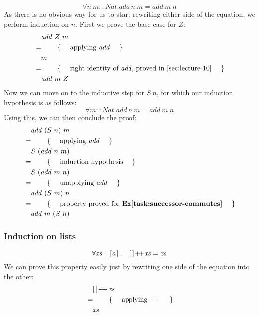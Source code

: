 \begin{displaymath}
\forall n~m :: \mathit{Nat} . \mathit{add}~n~m = \mathit{add}~m~n
\end{displaymath}
As there is no obvious way for us to start rewriting either side of the equation, we perform induction on $n$. First we prove the base case for $Z$:
\begin{align*}
\expr{\mathit{add}~Z~m}
\hint{applying $\mathit{add}$}
\expr{m}
\hint{right identity of $\mathit{add}$, proved in \Cref{sec:lecture-10}}
\lastexpr{\mathit{add}~m~Z}
\end{align*}
Now we can move on to the inductive step for $S~n$, for which our induction hypothesis is as follows:
\begin{displaymath}
\forall m :: \mathit{Nat} . \mathit{add}~n~m = \mathit{add}~m~n
\end{displaymath}
Using this, we can then conclude the proof:
\begin{align*}
&\quad \mathit{add}~(S~n)~m\\
&=\qquad\text{\{\quad\ applying $\mathit{add}$ \quad\}}\\
&\quad S~(\mathit{add}~n~m)\\
&=\qquad\text{\{\quad\ induction hypothesis \quad\}}\\
&\quad S~(\mathit{add}~m~n)\\
&=\qquad\text{\{\quad\ unapplying $\mathit{add}$ \quad\}}\\
&\quad \mathit{add}~(S~m)~n\\
&=\qquad\text{\{\quad\ property proved for \textbf{Ex\ref{task:successor-commutes}} \quad\}}\\
&\quad \mathit{add}~m~(S~n)
\end{align*}

\subsubsection{Induction on lists}

\begin{displaymath}
\forall \mathit{xs} :: \hslist{a}~. \quad \hslist{} \append \mathit{xs} = \mathit{xs}
\end{displaymath}
We can prove this property easily just by rewriting one side of the equation into the other:
\begin{align*}
\expr{\hslist{} \append \mathit{xs}}
\hint{applying $\append$}
\lastexpr{\mathit{xs}}
\end{align*}


